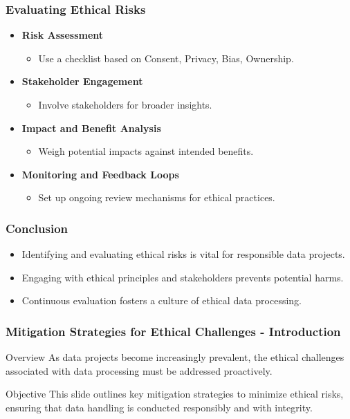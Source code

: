 \documentclass{beamer}
\begin{document}
\begin{frame}[fragile]
    \frametitle{Evaluating Ethical Risks}
    \begin{itemize}
        \item \textbf{Risk Assessment}
            \begin{itemize}
                \item Use a checklist based on Consent, Privacy, Bias, Ownership.
            \end{itemize}
        \item \textbf{Stakeholder Engagement}
            \begin{itemize}
                \item Involve stakeholders for broader insights.
            \end{itemize}
        \item \textbf{Impact and Benefit Analysis}
            \begin{itemize}
                \item Weigh potential impacts against intended benefits.
            \end{itemize}
        \item \textbf{Monitoring and Feedback Loops}
            \begin{itemize}
                \item Set up ongoing review mechanisms for ethical practices.
            \end{itemize}
    \end{itemize}
\end{frame}

\begin{frame}[fragile]
    \frametitle{Conclusion}
    \begin{itemize}
        \item Identifying and evaluating ethical risks is vital for responsible data projects.
        \item Engaging with ethical principles and stakeholders prevents potential harms.
        \item Continuous evaluation fosters a culture of ethical data processing.
    \end{itemize}
\end{frame}

\begin{frame}[fragile]
    \frametitle{Mitigation Strategies for Ethical Challenges - Introduction}
    \begin{block}{Overview}
        As data projects become increasingly prevalent, the ethical challenges associated with data processing must be addressed proactively. 
    \end{block}
    \begin{block}{Objective}
        This slide outlines key mitigation strategies to minimize ethical risks, ensuring that data handling is conducted responsibly and with integrity.
    \end{block}
\end{frame}
\end{document}
